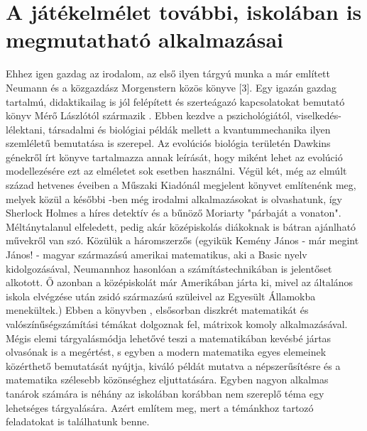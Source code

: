 \documentclass  {article}
\begin{document}
\section{A játékelmélet további, iskolában is megmutatható alkalmazásai}

Ehhez igen gazdag az irodalom, az első ilyen tárgyú munka a már említett Neumann és a közgazdász Morgenstern közös könyve [3]. Egy igazán gazdag tartalmú, didaktikailag is jól felépített és szerteágazó kapcsolatokat bemutató könyv Mérő Lászlótól származik \cite{mero}. Ebben kezdve a pszichológiától, viselkedés-lélektani, társadalmi és biológiai példák mellett a kvantummechanika ilyen szemléletű bemutatása is szerepel. Az evolúciós biológia területén Dawkins  génekről írt könyve \cite{8} tartalmazza annak leírását, hogy miként lehet az evolúció modellezésére ezt az elméletet sok esetben használni. Végül két, még az elmúlt század hetvenes éveiben a Műszaki Kiadónál megjelent könyvet említenénk meg, melyek közül a későbbi \cite{dawkins}-ben még irodalmi alkalmazásokat is olvashatunk, így Sherlock Holmes a híres detektív és a bűnöző Moriarty "párbaját a vonaton". Méltánytalanul elfeledett, pedig akár középiskolás diákoknak is bátran ajánlható művekről van szó. Közülük a háromszerzős (egyikük Kemény János - már megint János! - magyar származású amerikai matematikus, aki a Basic nyelv kidolgozásával, Neumannhoz hasonlóan a számítástechnikában is jelentőset alkotott. Ő azonban a középiskolát már Amerikában járta ki, mivel az általános iskola elvégzése után  zsidó származású szüleivel az Egyesült Államokba menekültek.) Ebben a könyvben \cite{dawkins}, elsősorban diszkrét matematikát és valószínűségszámítási témákat dolgoznak fel, mátrixok komoly alkalmazásával. Mégis elemi tárgyalásmódja lehetővé teszi a matematikában kevésbé jártas olvasónak is a megértést, s egyben a modern matematika egyes elemeinek közérthető bemutatását nyújtja, kiváló példát mutatva a népszerűsítésre és a matematika szélesebb közönséghez eljuttatására. Egyben nagyon alkalmas tanárok számára is néhány az iskolában korábban nem szereplő téma egy lehetséges tárgyalására. Azért említem meg, mert a témánkhoz tartozó feladatokat is találhatunk benne.         




\clearpage
\renewcommand{\refname}{Forrásjegyzék}


\end{document}
